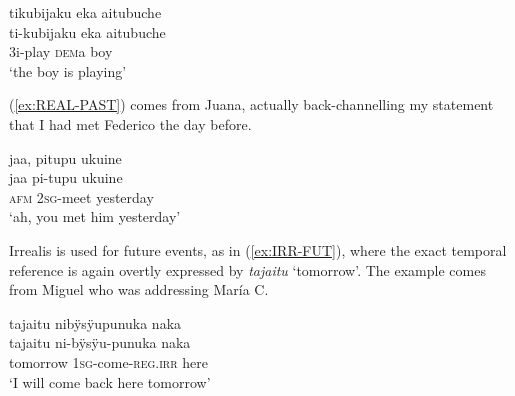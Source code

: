 \ea\label{ex:REAL-PRES-2}
\begingl 
\glpreamble tikubijaku eka aitubuche\\
\gla ti-kubijaku eka aitubuche\\ 
\glb 3i-play \textsc{dem}a boy\\ 
\glft ‘the boy is playing’\\ 
\endgl
 \trailingcitation{[mdx-c120416ls.183]}
\xe

(\ref{ex:REAL-PAST}) comes from Juana, actually back-channelling my statement that I had met Fe\-de\-ri\-co the day before.

\ea\label{ex:REAL-PAST}
\begingl 
\glpreamble jaa, pitupu ukuine\\
\gla jaa pi-tupu ukuine\\ 
\glb \textsc{afm} 2\textsc{sg}-meet yesterday\\ 
\glft ‘ah, you met him yesterday’\\ 
\endgl
 \trailingcitation{[jxx-e120516l-1.058]}
\xe
{}


Irrealis is used for future events, as in (\ref{ex:IRR-FUT}), where the exact temporal reference is again overtly expressed by \textit{tajaitu} ‘tomorrow’. The example comes from Miguel who was addressing María C.


\ea\label{ex:IRR-FUT}
\begingl
\glpreamble tajaitu nibÿsÿupunuka naka\\
\gla tajaitu ni-bÿsÿu-punuka naka\\
\glb tomorrow 1\textsc{sg}-come-\textsc{reg.irr} here\\
\glft ‘I will come back here tomorrow’
\endgl
 \trailingcitation{[mux-c110810l.140]}
\xe
{}



